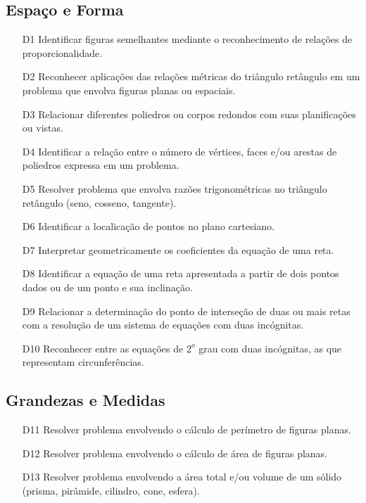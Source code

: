 \subsection{Espaço e Forma}
\begin{enumerate}
    \item[D1] \label{itm3:D1} Identificar figuras semelhantes mediante o reconhecimento de relações de proporcionalidade.
    \item[D2] \label{itm3:D2} Reconhecer aplicações das relações métricas do triângulo retângulo em um problema que envolva figuras planas ou espaciais.
    \item[D3] \label{itm3:D3} Relacionar diferentes poliedros ou corpos redondos com suas planificações ou vistas.
    \item[D4] \label{itm3:D4} Identificar a relação entre o número de vértices, faces e/ou arestas de poliedros expressa em um problema.
    \item[D5] \label{itm3:D5} Resolver problema que envolva razões trigonométricas no triângulo retângulo (seno, cosseno, tangente).
    \item[D6] \label{itm3:D6} Identificar a localicação de pontos no plano cartesiano.
    \item[D7] \label{itm3:D7} Interpretar geometricamente os coeficientes da equação de uma reta.
    \item[D8] \label{itm3:D8} Identificar a equação de uma reta apresentada a partir de dois pontos dados ou de um ponto e sua inclinação.
    \item[D9] \label{itm3:D9} Relacionar a determinação do ponto de interseção de duas ou mais retas com a resolução de um sistema de equações com duas incógnitas.
    \item[D10] \label{itm3:D10} Reconhecer entre as equações de $2^o$ grau com duas incógnitas, as que representam circunferências.
\end{enumerate}

\subsection{Grandezas e Medidas}
\begin{enumerate}
    \item[D11] \label{itm3:D11} Resolver problema envolvendo o cálculo de perímetro de figuras planas.
    \item[D12] \label{itm3:D12} Resolver problema envolvendo o cálculo de área de figuras planas.
    \item[D13] \label{itm3:D13} Resolver problema envolvendo a área total e/ou volume de um sólido (prisma, pirâmide, cilindro, cone, esfera).
\end{enumerate}

